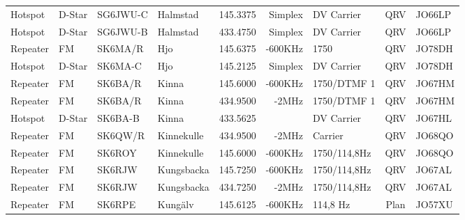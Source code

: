 \begin{landscape}
\begin{longtable}{llllrrlcl}
	Hotspot                   & D-Star        & SG6JWU-C      & Halmstad            & 145.3375          & Simplex        & DV Carrier       & QRV             & JO66LP           \\
	Hotspot                   & D-Star        & SG6JWU-B      & Halmstad            & 433.4750          & Simplex        & DV Carrier       & QRV             & JO66LP           \\
	Repeater                  & FM            & SK6MA/R       & Hjo                 & 145.6375          & -600KHz        & 1750             & QRV             & JO78DH           \\
	Hotspot                   & D-Star        & SK6MA-C       & Hjo                 & 145.2125          & Simplex        & DV Carrier       & QRV             & JO78DH           \\
	Repeater                  & FM            & SK6BA/R       & Kinna               & 145.6000          & -600KHz        & 1750/DTMF 1      & QRV             & JO67HM           \\
	Repeater                  & FM            & SK6BA/R       & Kinna               & 434.9500          & -2MHz          & 1750/DTMF 1      & QRV             & JO67HM           \\
	Hotspot                   & D-Star        & SK6BA-B       & Kinna               & 433.5625          &                & DV Carrier       & QRV             & JO67HL           \\
	Repeater                  & FM            & SK6QW/R       & Kinnekulle          & 434.9500          & -2MHz          & Carrier          & QRV             & JO68QO           \\
	Repeater                  & FM            & SK6ROY        & Kinnekulle          & 145.6000          & -600KHz        & 1750/114,8Hz     & QRV             & JO68QO           \\
	Repeater                  & FM            & SK6RJW        & Kungsbacka          & 145.7250          & -600KHz        & 1750/114,8Hz     & QRV             & JO67AL           \\
	Repeater                  & FM            & SK6RJW        & Kungsbacka          & 434.7250          & -2MHz          & 1750/114,8Hz     & QRV             & JO67AL           \\
	Repeater                  & FM            & SK6RPE        & Kungälv             & 145.6125          & -600KHz        & 114,8 Hz         & Plan            & JO57XU           \\

\end{longtable}
\end{landscape}
